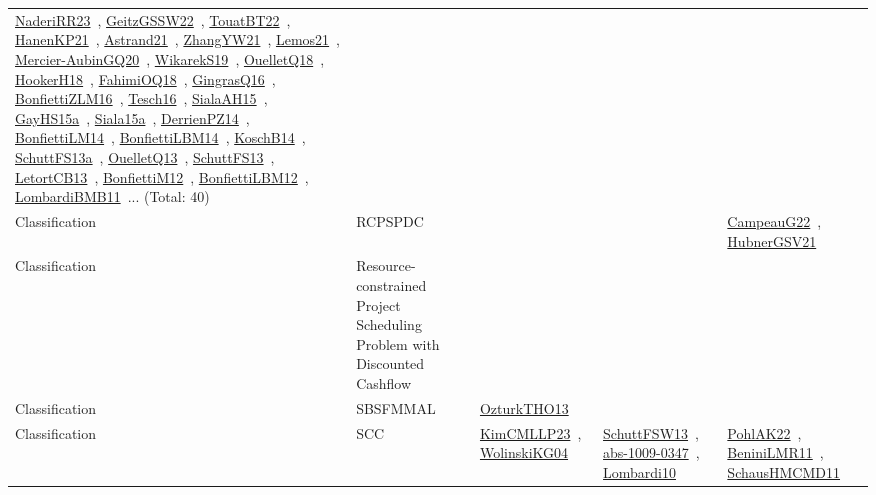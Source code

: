 {\begin{longtable}{lp{3cm}>{\raggedright\arraybackslash}p{6cm}>{\raggedright\arraybackslash}p{6cm}>{\raggedright\arraybackslash}p{8cm}}
\href{works/NaderiRR23.pdf}{NaderiRR23}~\cite{NaderiRR23}, \href{works/GeitzGSSW22.pdf}{GeitzGSSW22}~\cite{GeitzGSSW22}, \href{works/TouatBT22.pdf}{TouatBT22}~\cite{TouatBT22}, \href{works/HanenKP21.pdf}{HanenKP21}~\cite{HanenKP21}, \href{works/Astrand21.pdf}{Astrand21}~\cite{Astrand21}, \href{works/ZhangYW21.pdf}{ZhangYW21}~\cite{ZhangYW21}, \href{works/Lemos21.pdf}{Lemos21}~\cite{Lemos21}, \href{works/Mercier-AubinGQ20.pdf}{Mercier-AubinGQ20}~\cite{Mercier-AubinGQ20}, \href{works/WikarekS19.pdf}{WikarekS19}~\cite{WikarekS19}, \href{works/OuelletQ18.pdf}{OuelletQ18}~\cite{OuelletQ18}, \href{works/HookerH18.pdf}{HookerH18}~\cite{HookerH18}, \href{works/FahimiOQ18.pdf}{FahimiOQ18}~\cite{FahimiOQ18}, \href{works/GingrasQ16.pdf}{GingrasQ16}~\cite{GingrasQ16}, \href{works/BonfiettiZLM16.pdf}{BonfiettiZLM16}~\cite{BonfiettiZLM16}, \href{works/Tesch16.pdf}{Tesch16}~\cite{Tesch16}, \href{works/SialaAH15.pdf}{SialaAH15}~\cite{SialaAH15}, \href{works/GayHS15a.pdf}{GayHS15a}~\cite{GayHS15a}, \href{works/Siala15a.pdf}{Siala15a}~\cite{Siala15a}, \href{works/DerrienPZ14.pdf}{DerrienPZ14}~\cite{DerrienPZ14}, \href{works/BonfiettiLM14.pdf}{BonfiettiLM14}~\cite{BonfiettiLM14}, \href{works/BonfiettiLBM14.pdf}{BonfiettiLBM14}~\cite{BonfiettiLBM14}, \href{works/KoschB14.pdf}{KoschB14}~\cite{KoschB14}, \href{works/SchuttFS13a.pdf}{SchuttFS13a}~\cite{SchuttFS13a}, \href{works/OuelletQ13.pdf}{OuelletQ13}~\cite{OuelletQ13}, \href{works/SchuttFS13.pdf}{SchuttFS13}~\cite{SchuttFS13}, \href{works/LetortCB13.pdf}{LetortCB13}~\cite{LetortCB13}, \href{works/BonfiettiM12.pdf}{BonfiettiM12}~\cite{BonfiettiM12}, \href{works/BonfiettiLBM12.pdf}{BonfiettiLBM12}~\cite{BonfiettiLBM12}, \href{works/LombardiBMB11.pdf}{LombardiBMB11}~\cite{LombardiBMB11}... (Total: 40)\\
Classification & RCPSPDC &  &  & \href{works/CampeauG22.pdf}{CampeauG22}~\cite{CampeauG22}, \href{works/HubnerGSV21.pdf}{HubnerGSV21}~\cite{HubnerGSV21}\\
Classification & Resource-constrained Project Scheduling Problem with Discounted Cashflow &  &  & \\
Classification & SBSFMMAL & \href{works/OzturkTHO13.pdf}{OzturkTHO13}~\cite{OzturkTHO13} &  & \\
Classification & SCC & \href{works/KimCMLLP23.pdf}{KimCMLLP23}~\cite{KimCMLLP23}, \href{works/WolinskiKG04.pdf}{WolinskiKG04}~\cite{WolinskiKG04} & \href{works/SchuttFSW13.pdf}{SchuttFSW13}~\cite{SchuttFSW13}, \href{works/abs-1009-0347.pdf}{abs-1009-0347}~\cite{abs-1009-0347}, \href{works/Lombardi10.pdf}{Lombardi10}~\cite{Lombardi10} & \href{works/PohlAK22.pdf}{PohlAK22}~\cite{PohlAK22}, \href{works/BeniniLMR11.pdf}{BeniniLMR11}~\cite{BeniniLMR11}, \href{works/SchausHMCMD11.pdf}{SchausHMCMD11}~\cite{SchausHMCMD11}\\

\end{longtable}}
